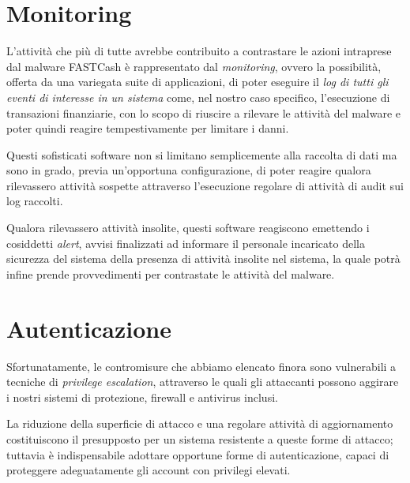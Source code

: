 \documentclass[10pt,a4paper, titlepage]{report}
\begin{document}
\section{Monitoring}

L'attività che più di tutte avrebbe contribuito a contrastare le azioni intraprese dal malware FASTCash è rappresentato dal \textit{monitoring}, ovvero la possibilità, offerta da una variegata suite di applicazioni, di poter eseguire il \textit{log di tutti gli eventi di interesse in un sistema} come, nel nostro caso specifico, l'esecuzione di transazioni finanziarie, con lo scopo di riuscire a rilevare le attività del malware e poter quindi reagire tempestivamente per limitare i danni.

Questi sofisticati software non si limitano semplicemente alla raccolta di dati ma sono in grado, previa un'opportuna configurazione, di poter reagire qualora rilevassero attività sospette attraverso l'esecuzione regolare di attività di audit sui log raccolti. 

Qualora rilevassero attività insolite, questi software reagiscono emettendo i cosiddetti \textit{alert}, avvisi finalizzati ad informare il personale incaricato della sicurezza del sistema della presenza di attività insolite nel sistema, la quale potrà infine prende provvedimenti per contrastate le attività del malware.

\section{Autenticazione}

Sfortunatamente, le contromisure che abbiamo elencato finora sono vulnerabili a tecniche di \textit{privilege escalation}, attraverso le quali gli attaccanti possono aggirare i nostri sistemi di protezione, firewall e antivirus inclusi.

La riduzione della superficie di attacco e una regolare attività di aggiornamento costituiscono il presupposto per un sistema resistente a queste forme di attacco; tuttavia è indispensabile adottare opportune forme di autenticazione, capaci di proteggere adeguatamente gli account con privilegi elevati.
\end{document}
